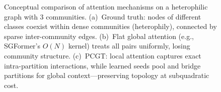 \begin{figure}[t]
{\begin{tikzpicture}
\end{tikzpicture}%
}
\caption{Conceptual comparison of attention mechanisms on a heterophilic graph with 3 communities.
(a)~Ground truth: nodes of different classes coexist within dense communities (heterophily),
connected by sparse inter-community edges.
(b)~Flat global attention (e.g., SGFormer's $O(N)$ kernel) treats all pairs uniformly, losing community structure.
(c)~PCGT: \textcolor{violet!80!black}{local attention} captures exact intra-partition interactions,
while \textcolor{cAzure!70!black}{learned seeds} pool and bridge partitions
for global context---preserving topology at subquadratic cost.}
\label{fig:conceptual}
\end{figure}
